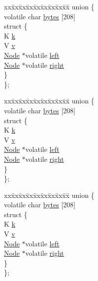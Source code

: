 \begin{DoxyCompactItemize}
\begin{tabbing}
\end{tabbing}\item 
\begin{tabbing}
xx\=xx\=xx\=xx\=xx\=xx\=xx\=xx\=xx\=\kill
union \{\\
\>volatile char \hyperlink{classNode_a4a5b8f90ab1220e757685cecea531793}{bytes} \mbox{[}208\mbox{]}\\
\>struct \{\\
\>\>K \hyperlink{classNode_a3a7754a22c66b5300a2892b18bc66c3f}{k}\\
\>\>V \hyperlink{classNode_aae93698bf451fa862b4b1b5466d36dfd}{v}\\
\>\>\hyperlink{classNode}{Node} $\ast$volatile \hyperlink{classNode_a13ed6bdab297ee3dc66ca598f51fdbb5}{left}\\
\>\>\hyperlink{classNode}{Node} $\ast$volatile \hyperlink{classNode_a1075c82d0b5b7ca91ce4d37b1d651b30}{right}\\
\>\} \\
\}; \\

\end{tabbing}\item 
\begin{tabbing}
xx\=xx\=xx\=xx\=xx\=xx\=xx\=xx\=xx\=\kill
union \{\\
\>volatile char \hyperlink{classNode_a4a5b8f90ab1220e757685cecea531793}{bytes} \mbox{[}208\mbox{]}\\
\>struct \{\\
\>\>K \hyperlink{classNode_a3a7754a22c66b5300a2892b18bc66c3f}{k}\\
\>\>V \hyperlink{classNode_aae93698bf451fa862b4b1b5466d36dfd}{v}\\
\>\>\hyperlink{classNode}{Node} $\ast$volatile \hyperlink{classNode_a13ed6bdab297ee3dc66ca598f51fdbb5}{left}\\
\>\>\hyperlink{classNode}{Node} $\ast$volatile \hyperlink{classNode_a1075c82d0b5b7ca91ce4d37b1d651b30}{right}\\
\>\} \\
\}; \\

\end{tabbing}\item 
\begin{tabbing}
xx\=xx\=xx\=xx\=xx\=xx\=xx\=xx\=xx\=\kill
union \{\\
\>volatile char \hyperlink{classNode_a4a5b8f90ab1220e757685cecea531793}{bytes} \mbox{[}208\mbox{]}\\
\>struct \{\\
\>\>K \hyperlink{classNode_a3a7754a22c66b5300a2892b18bc66c3f}{k}\\
\>\>V \hyperlink{classNode_aae93698bf451fa862b4b1b5466d36dfd}{v}\\
\>\>\hyperlink{classNode}{Node} $\ast$volatile \hyperlink{classNode_a13ed6bdab297ee3dc66ca598f51fdbb5}{left}\\
\>\>\hyperlink{classNode}{Node} $\ast$volatile \hyperlink{classNode_a1075c82d0b5b7ca91ce4d37b1d651b30}{right}\\
\>\} \\
\}; \\


\end{tabbing}
\end{DoxyCompactItemize}
